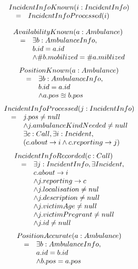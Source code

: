 \begin{equation*}
\begin{array}{rcl}
\multicolumn{3}{l}{IncidentInfoKnown(i:IncidentInfo)} \\ 
& = & IncidentInfoProcessed(i) \\
\end{array}
\end{equation*}

\begin{equation*}
\begin{array}{rcl}
\multicolumn{3}{l}{AvailabilityKnown(a: Ambulance)} \\
& = & \exists b: AmbulanceInfo, \\
&   & b.id = a.id \\
&   & \wedge \#b.mobilized = \#a.miblized \\
\end{array}
\end{equation*}
\begin{equation*}
\begin{array}{rcl}
\multicolumn{3}{l}{PositionKnown(a:Ambulance)} \\ 
& = & \exists b:AmbulanceInfo, \\
&   & b.id = a.id \\
&   & \wedge a.pos \approxeq b.pos \\
\end{array}
\end{equation*}
\begin{equation*}
\begin{array}{rcl}
\multicolumn{3}{l}{IncidentInfoProcessed(j:IncidentInfo)} \\ 
& = & j.pos \neq null \\
&   & \wedge j.ambulanceKindNeeded \neq null \\
&   & \exists c:Call, \exists i:Incident, \\
&   & (c.about \rightarrow i \wedge c.reporting \rightarrow j) \\
\end{array}
\end{equation*}
\begin{equation*}
\begin{array}{rcl}
\multicolumn{3}{l}{IncidentInfoRecorded(c:Call)} \\ 
& = & \exists j:IncidentInfo, \exists Incident, \\
&   & c.about \rightarrow i \\
&   & \wedge j.reporting \rightarrow c \\
&   & \wedge j.localisation \neq nul \\
&   & \wedge j.description \neq null \\
&   & \wedge j.victimAge \neq null \\
&   & \wedge j.victimPregrant \neq null \\
&   & \wedge j.id \neq null \\
\end{array}
\end{equation*}
\begin{equation*}
\begin{array}{rcl}
\multicolumn{3}{l}{PositionAccurate(a:Ambulance)} \\ 
& = & \exists b:AmbulanceInfo, \\
&   & a.id = b.id \\
&   & \wedge b.pos = a.pos \\
\end{array}
\end{equation*}

